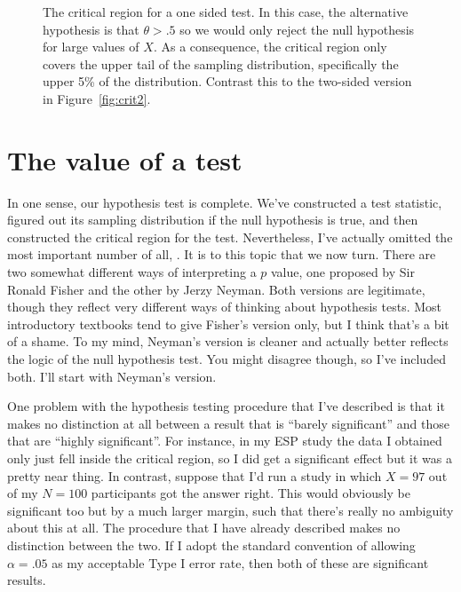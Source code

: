 \vspace{0.5cm}
\begin{figure}[t]
\begin{center}
\caption{The critical region for a one sided test. In this case, the alternative hypothesis is that $\theta > .5$ so we would only reject the null hypothesis for large values of $X$. As a consequence, the critical region only covers the upper tail of the sampling distribution, specifically the upper 5\% of the distribution. Contrast this to the two-sided version in Figure~\ref{fig:crit2}. }
\HR
\label{fig:crit1}
\end{center}
\end{figure}


\section{The \texorpdfstring{}{} value of a test~\label{sec:pvalue}}

In one sense, our hypothesis test is complete. We've constructed a test statistic, figured out its sampling distribution if the null hypothesis is true, and then constructed the critical region for the test. Nevertheless, I've actually omitted the most important number of all, . It is to this topic that we now turn. There are two somewhat different ways of interpreting a $p$ value, one proposed by Sir Ronald Fisher and the other by Jerzy Neyman. Both versions are legitimate, though they reflect very different ways of thinking about hypothesis tests. Most introductory textbooks tend to give Fisher's version only, but I think that's a bit of a shame. To my mind, Neyman's version is cleaner and actually better reflects the logic of the null hypothesis test. You might disagree though, so I've included both. I'll start with Neyman's version.


One problem with the hypothesis testing procedure that I've described is that it makes no distinction at all between a result that is ``barely significant'' and those that are ``highly significant''. For instance, in my ESP study the data I obtained only just fell inside the critical region, so I did get a significant effect but it was a pretty near thing. In contrast, suppose that I'd run a study in which $X=97$ out of my $N=100$ participants got the answer right. This would obviously be significant too but by a much larger margin, such that there's really no ambiguity about this at all. The procedure that I have already described makes no distinction between the two. If I adopt the standard convention of allowing $\alpha = .05$ as my acceptable Type I error rate, then both of these are significant results. 

